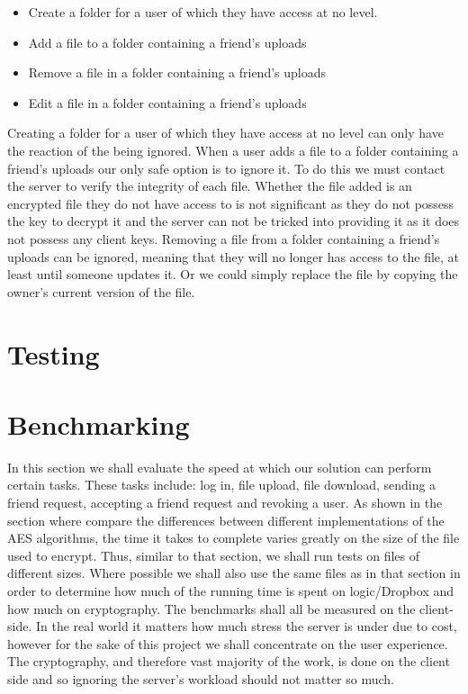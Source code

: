 \documentclass[12pt, titlepage]{article}
\begin{document}
\begin{itemize}
	\item Create a folder for a user of which they have access at no level.
	\item Add a file to a folder containing a friend's uploads
	\item Remove a file in a folder containing a friend's uploads
	\item Edit a file in a folder containing a friend's uploads
\end{itemize}
Creating a folder for a user of which they have access at no level can only have the reaction of the being ignored.
\newline \indent When a user adds a file to a folder containing a friend's uploads our only safe option is to ignore it. To do this we must contact the server to verify the integrity of each file. Whether the file added is an encrypted file they do not have access to is not significant as they do not possess the key to decrypt it and the server can not be tricked into providing it as it does not possess any client keys.
\newline \indent Removing a file from a folder containing a friend's uploads can be ignored, meaning that they will no longer has access to the file, at least until someone updates it. Or we could simply replace the file by copying the owner's current version of the file.

\section{Testing}


\section{Benchmarking}
In this section we shall evaluate the speed at which our solution can perform certain tasks. These tasks include: log in, file upload, file download, sending a friend request, accepting a friend request and revoking a user.
\newline \indent As shown in the section where compare the differences between different implementations of the AES algorithms, the time it takes to complete varies greatly on the size of the file used to encrypt. Thus, similar to that section, we shall run tests on files of different sizes. Where possible we shall also use the same files as in that section in order to determine how much of the running time is spent on logic/Dropbox and how much on cryptography.
\newline \indent The benchmarks shall all be measured on the client-side. In the real world it matters how much stress the server is under due to cost, however for the sake of this project we shall concentrate on the user experience. The cryptography, and therefore vast majority of the work, is done on the client side and so ignoring the server's workload should not matter so much.
\end{document}
